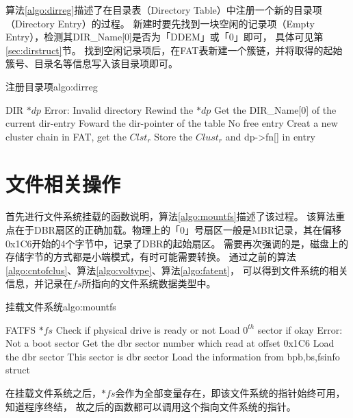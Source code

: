 算法\ref{algo:dirreg}描述了在目录表（Directory Table）中注册一个新的目录项（Directory Entry）的过程。
新建时要先找到一块空闲的记录项（Empty Entry），检测其DIR\_Name[0]是否为「DDEM」或「0」即可，
具体可见第\ref{sec:dirstruct}节。
找到空闲记录项后，在FAT表新建一个簇链，并将取得的起始簇号、目录名等信息写入该目录项即可。
\begin{balgo}{注册目录项}{algo:dirreg}
\begin{algorithmic}[1]
\Require DIR $*dp$
    \State \Return Error: Invalid directory
\Else
    \State Rewind the $*dp$
    \Repeat
    \State Get the DIR\_Name[0] of the current dir-entry
    \State Foward the dir-pointer of the table
        \State \Return No free entry
    \Else
        \State Creat a new cluster chain in FAT, get the $Clst_r$
        \State Store the $Clust_r$ and dp->fn[] in entry
    \EndIf
\EndIf
\end{algorithmic}
\end{balgo}

\section{文件相关操作}
\label{sec:filfunc}

首先进行文件系统挂载的函数说明，算法\ref{algo:mountfs}描述了该过程。
该算法重点在于DBR扇区的正确加载。物理上的「0」号扇区一般是MBR记录，其在偏移0x1C6开始的4个字节中，记录了DBR的起始扇区。
需要再次强调的是，磁盘上的存储字节的方式都是小端模式，有时可能需要转换。
通过之前的算法\ref{algo:cntofclus}、算法\ref{algo:voltype}、算法\ref{algo:fatent}，
可以得到文件系统的相关信息，并记录在$fs$所指向的文件系统数据类型中。
\begin{balgo}{挂载文件系统}{algo:mountfs}
\begin{algorithmic}[1]
\Require FATFS $*fs$
\State Check if physical drive is ready or not
\State Load $0^{th}$ sector if okay
    \State \Return Error: Not a boot sector
    \State Get the dbr sector number which read at offset 0x1C6
    \State Load the dbr sector
\Else 
    \State This sector is dbr sector
\EndIf
\State Load the information from bpb,bs,fsinfo struct

\end{algorithmic}
\end{balgo}

在挂载文件系统之后，$*fs$会作为全部变量存在，即该文件系统的指针始终可用，知道程序终结，
故之后的函数都可以调用这个指向文件系统的指针。

